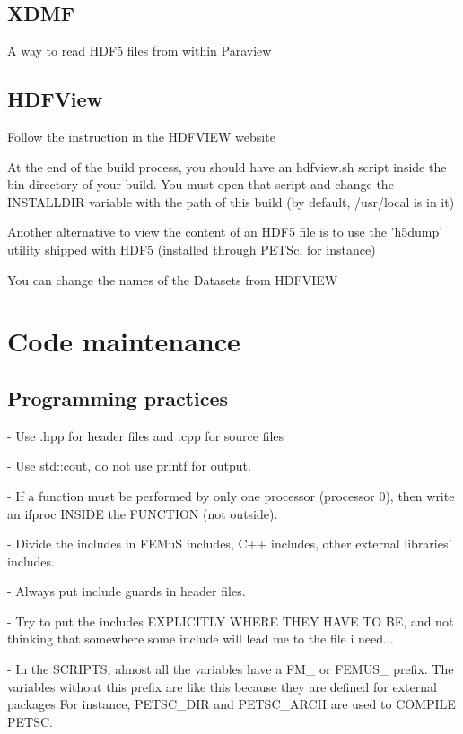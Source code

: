 \documentclass[10pt]{book}
\begin{document}
 \chapter{XDMF}
 
 A way to read HDF5 files from within Paraview

 \chapter{HDFView}
 
Follow the instruction in the HDFVIEW website

At the end of the build process, you should have an hdfview.sh script inside the bin directory of your build.
You must open that script and change the INSTALLDIR variable with the path of this build (by default, /usr/local is in it)

Another alternative to view the content of an HDF5 file is to use the 'h5dump' utility shipped with HDF5 (installed through PETSc, for instance)

You can change the names of the Datasets from HDFVIEW
   
 
\part{Code maintenance}

  \chapter{Programming practices}
  
- Use .hpp for header files and .cpp for source files

- Use std::cout, do not use printf for output.

- If a function must be performed by only one processor (processor 0),
then write an ifproc INSIDE the FUNCTION (not outside).

- Divide the includes in 
FEMuS includes,
 C++ includes,
 other external libraries' includes.

- Always put include guards in header files.

- Try to put the includes EXPLICITLY WHERE THEY HAVE TO BE, 
  and not thinking that somewhere some include will lead me to the file i need...

- In the SCRIPTS, almost all the variables have a FM\_ or FEMUS\_ prefix.
 The variables without this prefix are like this because 
 they are defined for external packages
 For instance, PETSC\_DIR and PETSC\_ARCH are used to COMPILE PETSC.
 
\end{document}
